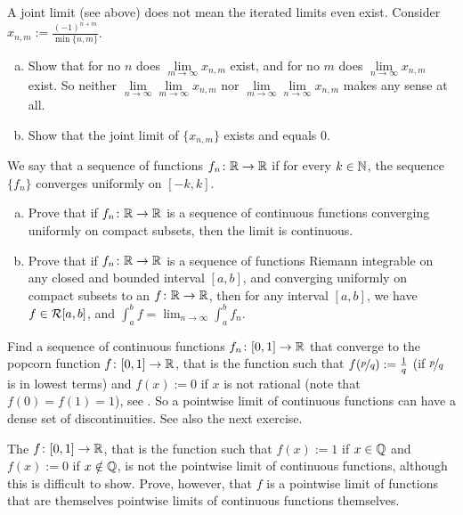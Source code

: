 \begin{exercise}
A joint limit (see above) does not mean the iterated limits even exist.
Consider $x_{n,m} := \frac{{(-1)}^{n+m}}{\min \{n,m \}}$.
\begin{enumerate}[a)]
\item
Show that for no $n$ does
$\lim\limits_{m \to \infty} x_{n,m}$ exist, and for no $m$
does 
$\lim\limits_{n \to \infty} x_{n,m}$ exist.  So neither
$\lim\limits_{n\to\infty}\lim\limits_{m \to \infty} x_{n,m}$ nor
$\lim\limits_{m\to\infty}\lim\limits_{n \to \infty} x_{n,m}$ makes any sense
at all.
\item
Show that the joint limit of $\{ x_{n,m} \}$ exists and equals 0.
\end{enumerate}
\end{exercise}

\begin{exercise}
We say that a sequence of functions $f_n \colon {\mathbb{R}} \to {\mathbb{R}}$
\emph{}
if for every $k \in {\mathbb{N}}$,
the sequence $\{ f_n \}$ converges uniformly on $[-k,k]$.
\begin{enumerate}[a)]
\item
Prove that if $f_n \colon {\mathbb{R}} \to {\mathbb{R}}$ is a sequence of
continuous functions converging uniformly on compact subsets, then
the limit is continuous.
\item 
Prove that if $f_n \colon {\mathbb{R}} \to {\mathbb{R}}$ is a sequence of
functions Riemann integrable on any closed and bounded interval $[a,b]$,
and converging uniformly on compact subsets to an $f \colon {\mathbb{R}} \to {\mathbb{R}}$,
then for any interval $[a,b]$, we have $f \in {\mathcal{R}}[a,b]$, and
$\int_a^b f = \lim_{n\to\infty} \int_a^b f_n$.
\end{enumerate}
\end{exercise}

\begin{exercise}[Challenging]
Find a sequence of continuous functions $f_n \colon [0,1] \to {\mathbb{R}}$ that
converge to the popcorn function $f \colon [0,1] \to {\mathbb{R}}$, that is the
function such that $f(\nicefrac{p}{q}) := \frac{1}{q}$ (if $\nicefrac{p}{q}$
is in lowest terms) and $f(x) := 0$ if $x$ is not rational (note
that $f(0) = f(1) = 1$),
see .
So a pointwise limit of continuous functions can have a dense set of
discontinuities.  See also the next exercise.
\end{exercise}

\begin{exercise}[Challenging]
The 
$f \colon [0,1] \to {\mathbb{R}}$, that is the
function such that $f(x) := 1$ if $x \in {\mathbb{Q}}$
and $f(x) := 0$ if $x \notin {\mathbb{Q}}$,
is not the pointwise limit of
continuous functions, although this is difficult to show.
Prove, however, that $f$ is a pointwise limit of functions that are themselves
pointwise limits of
continuous functions themselves.
\end{exercise}

